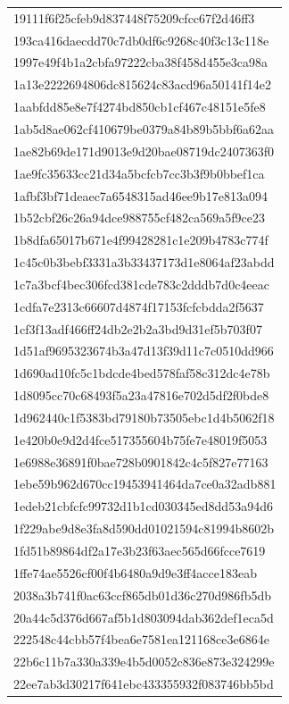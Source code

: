 \begin{tabular}{l}
19111f6f25cfeb9d837448f75209cfcc67f2d46ff3 \\
193ca416daecdd70c7db0df6c9268c40f3c13c118e \\
1997e49f4b1a2cbfa97222cba38f458d455e3ca98a \\
1a13e2222694806dc815624c83acd96a50141f14e2 \\
1aabfdd85e8e7f4274bd850cb1cf467c48151e5fe8 \\
1ab5d8ae062cf410679be0379a84b89b5bbf6a62aa \\
1ae82b69de171d9013e9d20bae08719dc2407363f0 \\
1ae9fc35633cc21d34a5bcfcb7cc3b3f9b0bbef1ca \\
1afbf3bf71deaec7a6548315ad46ee9b17e813a094 \\
1b52cbf26c26a94dce988755cf482ca569a5f9ce23 \\
1b8dfa65017b671e4f99428281c1e209b4783c774f \\
1c45c0b3bebf3331a3b33437173d1e8064af23abdd \\
1c7a3bcf4bec306fcd381cde783c2dddb7d0c4eeac \\
1cdfa7e2313c66607d4874f17153fcfcbdda2f5637 \\
1cf3f13adf466ff24db2e2b2a3bd9d31ef5b703f07 \\
1d51af9695323674b3a47d13f39d11c7c0510dd966 \\
1d690ad10fc5c1bdcde4bed578faf58c312dc4e78b \\
1d8095cc70c68493f5a23a47816e702d5df2f0bde8 \\
1d962440c1f5383bd79180b73505ebc1d4b5062f18 \\
1e420b0e9d2d4fce517355604b75fe7e48019f5053 \\
1e6988e36891f0bae728b0901842c4c5f827e77163 \\
1ebe59b962d670cc19453941464da7ce0a32adb881 \\
1edeb21cbfcfc99732d1b1cd030345ed8dd53a94d6 \\
1f229abe9d8e3fa8d590dd01021594c81994b8602b \\
1fd51b89864df2a17e3b23f63aec565d66fcce7619 \\
1ffe74ae5526cf00f4b6480a9d9e3ff4acce183eab \\
2038a3b741f0ac63ccf865db01d36c270d986fb5db \\
20a44c5d376d667af5b1d803094dab362def1eca5d \\
222548c44cbb57f4bea6e7581ea121168ce3e6864e \\
22b6c11b7a330a339e4b5d0052c836e873e324299e \\
22ee7ab3d30217f641ebc433355932f083746bb5bd \\

\end{tabular}
